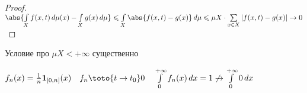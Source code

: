 \begin{proof}\thmslashn
	
	$\abs{\int\limits_{X} f(x, t) \,d\mu (x) - \int\limits_{X} g(x)\,d\mu} \leqslant \int\limits_{X} \abs{f(x, t) - g(x)}\,d\mu \leqslant \mu X \cdot \sum\limits_{x\in X} |f(x, t) - g(x)| \to 0$	
	
\end{proof}

\begin{remark}\thmslashn
	
	Условие про $\mu X < +\infty$ существенно
	
	$f_n(x) = \frac{1}{n} \mathbf{1}_{[0, n]}(x) \quad f_n \toto{t\to t_0} 0 \quad \int\limits_{0}^{+\infty} f_n(x) \,dx = 1 \not \to \int\limits_{0}^{+\infty} 0 \,dx$ 
	
\end{remark}
